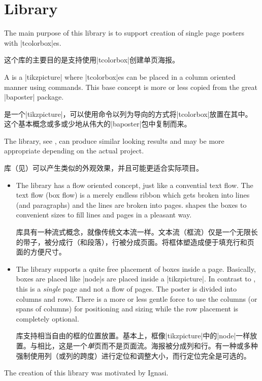 \section{Library }\label{sec:poster}%
%

The main purpose of this library is to support creation of single page posters
with |tcolorbox|es.

这个库的主要目的是支持使用|tcolorbox|创建单页海报。

A  is a |tikzpicture| where |tcolorbox|es can be
placed in a column oriented manner using  commands.
This base concept is more or less copied from the great |baposter| package.

是一个|tikzpicture|，可以使用命令以列为导向的方式将|tcolorbox|放置在其中。
这个基本概念或多或少地从伟大的|baposter|包中复制而来。

The  library, see , can produce
similar looking results and may be more appropriate
depending on the actual project.

库（见）可以产生类似的外观效果，并且可能更适合实际项目。
\begin{itemize}
\item The  library has a flow oriented concept, just like a
  convential text flow. The text flow (box flow) is a merely endless ribbon
  which gets broken into lines (and paragraphs) and the lines are broken
  into pages.  shapes the boxes to convenient sizes to fill
  lines and pages in a pleasant way.

  库具有一种流式概念，就像传统文本流一样。文本流（框流）仅是一个无限长的带子，被分成行（和段落），行被分成页面。将框体塑造成便于填充行和页面的方便尺寸。
\item The  library supports a quite free placement of
  boxes inside a page.
  Basically, boxes are placed like |node|s are placed inside a |tikzpicture|.
  In contrast to , this is a \emph{single} page
  and not a flow of pages.
  The poster is divided into columns and rows.
  There is a more or less gentle force to use the columns (or spans of columns)
  for positioning and sizing while the row placement is completely optional.

库支持相当自由的框的位置放置。基本上，框像|tikzpicture|中的|node|一样放置。与相比，这是一个\emph{单}页而不是页面流。海报被分成列和行。有一种或多种强制使用列（或列的跨度）进行定位和调整大小，而行定位完全是可选的。
\end{itemize}
The creation of this library was motivated by Ignasi.

